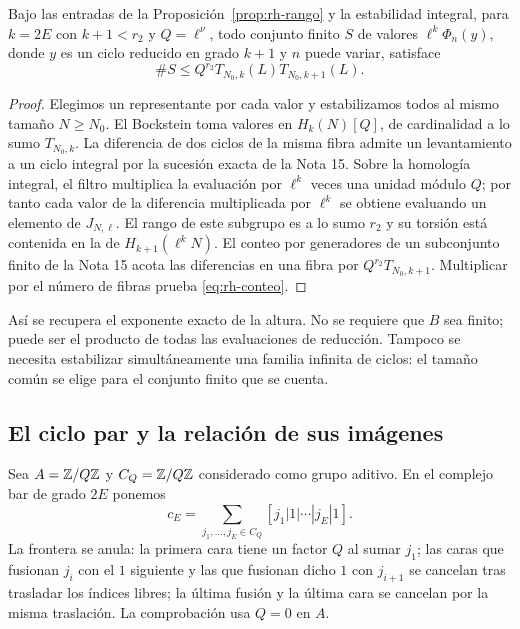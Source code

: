 \begin{teorema}
\label{thm:rh-valores}
Bajo las entradas de la Proposición~\ref{prop:rh-rango} y la estabilidad integral, para $k=2E$ con $k+1<r_2$ y $Q=\ell^\nu$, todo conjunto finito $S$ de valores $\ell^k\Phi_n(y)$, donde $y$ es un ciclo reducido en grado $k+1$ y $n$ puede variar, satisface
\begin{equation}
 \#S\le Q^{r_2}T_{N_0,k}(L)T_{N_0,k+1}(L).
 \label{eq:rh-conteo}
\end{equation}
\end{teorema}
\begin{proof}
Elegimos un representante por cada valor y estabilizamos todos al mismo tamaño $N\ge N_0$. El Bockstein toma valores en $H_k(N)[Q]$, de cardinalidad a lo sumo $T_{N_0,k}$. La diferencia de dos ciclos de la misma fibra admite un levantamiento a un ciclo integral por la sucesión exacta de la Nota 15. Sobre la homología integral, el filtro multiplica la evaluación por $\ell^k$ veces una unidad módulo $Q$; por tanto cada valor de la diferencia multiplicada por $\ell^k$ se obtiene evaluando un elemento de $J_{N,\ell}$. El rango de este subgrupo es a lo sumo $r_2$ y su torsión está contenida en la de $H_{k+1}(\ell^kN)$. El conteo por generadores de un subconjunto finito de la Nota 15 acota las diferencias en una fibra por $Q^{r_2}T_{N_0,k+1}$. Multiplicar por el número de fibras prueba \eqref{eq:rh-conteo}.
\end{proof}

Así se recupera el exponente exacto de la altura. No se requiere que $B$ sea finito; puede ser el producto de todas las evaluaciones de reducción. Tampoco se necesita estabilizar simultáneamente una familia infinita de ciclos: el tamaño común se elige para el conjunto finito que se cuenta.

\subsection{El ciclo par y la relación de sus imágenes}

Sea $A=\mathbb{Z}/Q\mathbb{Z}$ y $C_Q=\mathbb{Z}/Q\mathbb{Z}$ considerado como grupo aditivo. En el complejo bar de grado $2E$ ponemos
\begin{equation}
 c_E=\sum_{j_1,\dots,j_E\in C_Q}
 [j_1|1|\cdots|j_E|1].
 \label{eq:rh-ciclo-par}
\end{equation}
La frontera se anula: la primera cara tiene un factor $Q$ al sumar $j_1$; las caras que fusionan $j_i$ con el $1$ siguiente y las que fusionan dicho $1$ con $j_{i+1}$ se cancelan tras trasladar los índices libres; la última fusión y la última cara se cancelan por la misma traslación. La comprobación usa $Q=0$ en $A$.

